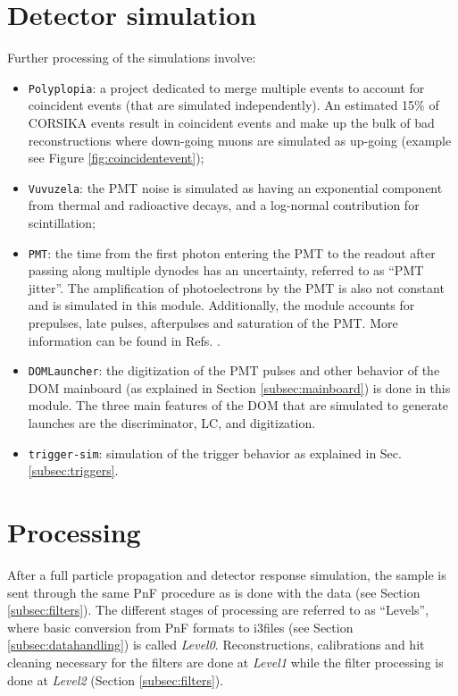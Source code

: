 \section{Detector simulation}
Further processing of the simulations involve:
\vspace{2mm}
\begin{itemize}
\item \texttt{Polyplopia}: a project dedicated to merge multiple events to account for coincident events (that are simulated independently). An estimated 15\% of CORSIKA events result in coincident events and make up the bulk of bad reconstructions where down-going muons are simulated as up-going (example see Figure \ref{fig:coincidentevent});
\item \texttt{Vuvuzela}: the PMT noise is simulated as having an exponential component from  thermal and radioactive decays, and a log-normal contribution for scintillation;
\item \texttt{PMT}: the time from the first photon entering the PMT to the readout after passing along multiple dynodes has an uncertainty, referred to as ``PMT jitter''. The amplification of photoelectrons by the PMT is also not constant and is simulated in this module. Additionally, the module accounts for prepulses, late pulses, afterpulses and saturation of the PMT. More information can be found in Refs. \cite{Abbasi:2010vc,Ma:2009aw}.
\item \texttt{DOMLauncher}: the digitization of the PMT pulses and other behavior of the DOM mainboard (as explained in Section \ref{subsec:mainboard}) is done in this module. The three main features of the DOM that are simulated to generate launches are the discriminator, LC, and digitization.
\item \texttt{trigger-sim}: simulation of the trigger behavior as explained in Sec. \ref{subsec:triggers}.
\end{itemize}

\section{Processing}
\label{sec:processing}
After a full particle propagation and detector response simulation, the sample is sent through the same PnF procedure as is done with the data (see Section \ref{subsec:filters}). The different stages of processing are referred to as ``Levels'', where basic conversion from PnF formats to i3files (see Section \ref{subsec:datahandling}) is called \textit{Level0}. Reconstructions, calibrations and hit cleaning necessary for the filters are done at \textit{Level1} while the filter processing is done at \textit{Level2} (Section \ref{subsec:filters}).

